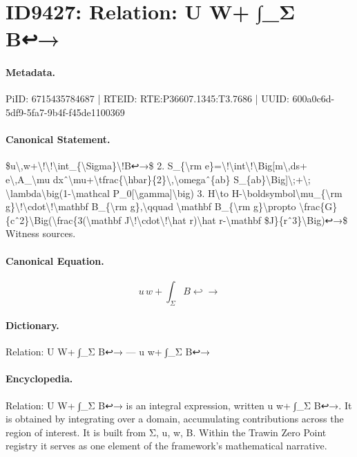 \section*{ID9427: Relation: U W+ ∫\_Σ B↩→}
\paragraph{Metadata.}
PiID: 6715435784687 | RTEID: RTE:P36607.1345:T3.7686 | UUID: 600a0c6d-5df9-5fa7-9b4f-f45de1100369

\paragraph{Canonical Statement.}
\$u\textbackslash{},w+\textbackslash{}!\textbackslash{}!\textbackslash{}int\_\{\textbackslash{}Sigma\}\textbackslash{}!B↩→\$ 2. S\_\{\textbackslash{}rm e\}=\textbackslash{}!\textbackslash{}int\textbackslash{}!\textbackslash{}Big[m\textbackslash{},ds+ e\textbackslash{},A\_\textbackslash{}mu dxˆ\textbackslash{}mu+\textbackslash{}tfrac\{\textbackslash{}hbar\}\{2\}\textbackslash{},\textbackslash{}omegaˆ\{ab\} S\_\{ab\}\textbackslash{}Big]\textbackslash{};+\textbackslash{}; \textbackslash{}lambda\textbackslash{}big(1-\textbackslash{}mathcal P\_0[\textbackslash{}gamma]\textbackslash{}big) 3. H\textbackslash{}to H-\textbackslash{}boldsymbol\textbackslash{}mu\_\{\textbackslash{}rm g\}\textbackslash{}!\textbackslash{}cdot\textbackslash{}!\textbackslash{}mathbf B\_\{\textbackslash{}rm g\},\textbackslash{}qquad \textbackslash{}mathbf B\_\{\textbackslash{}rm g\}\textbackslash{}propto \textbackslash{}frac\{G\}\{cˆ2\}\textbackslash{}Big(\textbackslash{}frac\{3(\textbackslash{}mathbf J\textbackslash{}!\textbackslash{}cdot\textbackslash{}!\textbackslash{}hat r)\textbackslash{}hat r-\textbackslash{}mathbf \$J\}\{rˆ3\}\textbackslash{}Big)↩→\$ Witness sources.

\paragraph{Canonical Equation.}
\[
u\,w+\!\!\int_{\Sigma}\!B↩→
\]

\paragraph{Dictionary.}
Relation: U W+ ∫\_Σ B↩→ — u w+ ∫\_Σ B↩→

\paragraph{Encyclopedia.}
Relation: U W+ ∫\_Σ B↩→ is an integral expression, written u w+ ∫\_Σ B↩→. It is obtained by integrating over a domain, accumulating contributions across the region of interest. It is built from Σ, u, w, B. Within the Trawin Zero Point registry it serves as one element of the framework's mathematical narrative.
